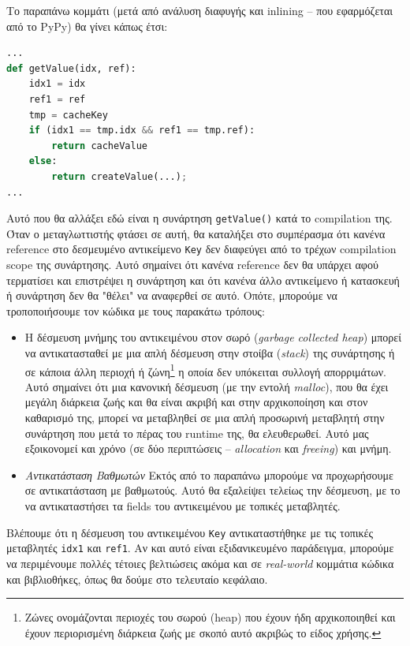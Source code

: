 Το παραπάνω κομμάτι (μετά από ανάλυση διαφυγής και inlining – που εφαρμόζεται
από το PyPy) θα γίνει κάπως έτσι:

\begin{lstlisting}[language=Python]
...
def getValue(idx, ref):
    idx1 = idx
    ref1 = ref
    tmp = cacheKey
    if (idx1 == tmp.idx && ref1 == tmp.ref):
        return cacheValue
    else:
        return createValue(...);
...

\end{lstlisting}

Αυτό που θα αλλάξει εδώ είναι η συνάρτηση \texttt{getValue()} κατά το
compilation της. Όταν ο μεταγλωττιστής φτάσει σε αυτή, θα καταλήξει στο
συμπέρασμα ότι κανένα reference στο δεσμευμένο αντικείμενο \texttt{Key} δεν
διαφεύγει από το τρέχων compilation scope της συνάρτησης. Αυτό σημαίνει ότι
κανένα reference δεν θα υπάρχει αφού τερματίσει και επιστρέψει η συνάρτηση και
ότι κανένα άλλο αντικείμενο ή κατασκευή ή συνάρτηση δεν θα "θέλει" να αναφερθεί
σε αυτό. Οπότε, μπορούμε να τροποποιήσουμε τον κώδικα με τους παρακάτω τρόπους:

\begin{itemize}

\item Η δέσμευση μνήμης του αντικειμένου στον σωρό (\textit{garbage collected
heap}) μπορεί να αντικατασταθεί με μια απλή δέσμευση στην στοίβα
(\textit{stack}) της συνάρτησης ή σε κάποια άλλη περιοχή ή ζώνη\footnote{Ζώνες
ονομάζονται περιοχές του σωρού (heap) που έχουν ήδη αρχικοποιηθεί και έχουν
περιορισμένη διάρκεια ζωής με σκοπό αυτό ακριβώς το είδος χρήσης.} η οποία δεν
υπόκειται συλλογή απορριμάτων. Αυτό σημαίνει ότι μια κανονική δέσμευση (με την
εντολή \textit{malloc}), που θα έχει μεγάλη διάρκεια ζωής και θα είναι ακριβή
και στην αρχικοποίηση και στον καθαρισμό της, μπορεί να μεταβληθεί σε μια απλή
προσωρινή μεταβλητή στην συνάρτηση που μετά το πέρας του runtime της, θα
ελευθερωθεί. Αυτό μας εξοικονομεί και χρόνο (σε δύο περιπτώσεις –
\textit{allocation} και \textit{freeing}) και μνήμη.

\item \textit{Αντικατάσταση Βαθμωτών} Εκτός από το παραπάνω μπορούμε
να προχωρήσουμε σε αντικατάσταση με βαθμωτούς. Αυτό θα εξαλείψει τελείως την
δέσμευση, με το να αντικαταστήσει τα fields του αντικειμένου με τοπικές
μεταβλητές.

\end{itemize}

Βλέπουμε ότι η δέσμευση του αντικειμένου \texttt{Key} αντικαταστήθηκε με τις
τοπικές μεταβλητές \texttt{idx1} και \texttt{ref1}. Αν και αυτό είναι
εξιδανικευμένο παράδειγμα, μπορούμε να περιμένουμε πολλές τέτοιες βελτιώσεις
ακόμα και σε \textit{real-world} κομμάτια κώδικα και βιβλιοθήκες, όπως θα δούμε
στο τελευταίο κεφάλαιο.

